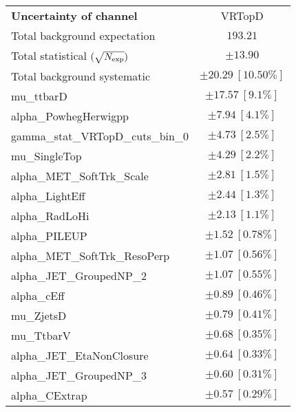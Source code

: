 
\begin{table}
\begin{center}
\setlength{\tabcolsep}{0.0pc}
\begin{tabular*}{\textwidth}{@{\extracolsep{\fill}}lc}
\noalign{\smallskip}\hline\noalign{\smallskip}
{\bf Uncertainty of channel}                                    & VRTopD            \\
\noalign{\smallskip}\hline\noalign{\smallskip}
Total background expectation             &  $193.21$       \\
\noalign{\smallskip}\hline\noalign{\smallskip}
Total statistical $(\sqrt{N_{\rm exp}})$              & $\pm 13.90$       \\
Total background systematic               & $\pm 20.29\ [10.50\%] $             \\
\noalign{\smallskip}\hline\noalign{\smallskip}
\noalign{\smallskip}\hline\noalign{\smallskip}
mu\_ttbarD         & $\pm 17.57\ [9.1\%] $       \\
alpha\_PowhegHerwigpp         & $\pm 7.94\ [4.1\%] $       \\
gamma\_stat\_VRTopD\_cuts\_bin\_0         & $\pm 4.73\ [2.5\%] $       \\
mu\_SingleTop         & $\pm 4.29\ [2.2\%] $       \\
alpha\_MET\_SoftTrk\_Scale         & $\pm 2.81\ [1.5\%] $       \\
alpha\_LightEff         & $\pm 2.44\ [1.3\%] $       \\
alpha\_RadLoHi         & $\pm 2.13\ [1.1\%] $       \\
alpha\_PILEUP         & $\pm 1.52\ [0.78\%] $       \\
alpha\_MET\_SoftTrk\_ResoPerp         & $\pm 1.07\ [0.56\%] $       \\
alpha\_JET\_GroupedNP\_2         & $\pm 1.07\ [0.55\%] $       \\
alpha\_cEff         & $\pm 0.89\ [0.46\%] $       \\
mu\_ZjetsD         & $\pm 0.79\ [0.41\%] $       \\
mu\_TtbarV         & $\pm 0.68\ [0.35\%] $       \\
alpha\_JET\_EtaNonClosure         & $\pm 0.64\ [0.33\%] $       \\
alpha\_JET\_GroupedNP\_3         & $\pm 0.60\ [0.31\%] $       \\
alpha\_CExtrap         & $\pm 0.57\ [0.29\%] $       \\

\end{tabular*}
\end{center}
\end{table}
